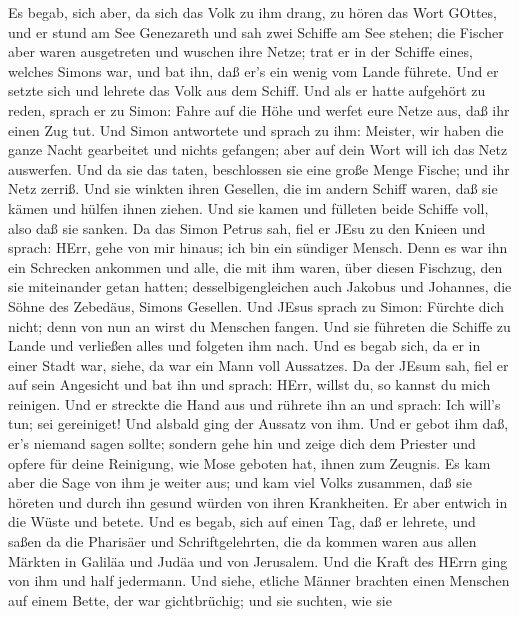 Es begab, sich aber, da sich das Volk zu ihm drang, zu
hören das Wort GOttes, und er stund am See Genezareth  und
sah zwei Schiffe am See stehen; die Fischer aber waren ausgetreten und
wuschen ihre Netze;  trat er in der Schiffe eines, welches
Simons war, und bat ihn, daß er's ein wenig vom Lande führete. Und er
setzte sich und lehrete das Volk aus dem Schiff.  Und als er
hatte aufgehört zu reden, sprach er zu Simon: Fahre auf die Höhe und
werfet eure Netze aus, daß ihr einen Zug tut.  Und Simon
antwortete und sprach zu ihm: Meister, wir haben die ganze Nacht
gearbeitet und nichts gefangen; aber auf dein Wort will ich das Netz
auswerfen.  Und da sie das taten, beschlossen sie eine große
Menge Fische; und ihr Netz zerriß.  Und sie winkten ihren
Gesellen, die im andern Schiff waren, daß sie kämen und hülfen ihnen
ziehen. Und sie kamen und fülleten beide Schiffe voll, also daß sie
sanken.  Da das Simon Petrus sah, fiel er JEsu zu den Knieen
und sprach: HErr, gehe von mir hinaus; ich bin ein sündiger Mensch.
 Denn es war ihn ein Schrecken ankommen und alle, die mit
ihm waren, über diesen Fischzug, den sie miteinander getan hatten;
 desselbigengleichen auch Jakobus und Johannes, die Söhne
des Zebedäus, Simons Gesellen. Und JEsus sprach zu Simon: Fürchte dich
nicht; denn von nun an wirst du Menschen fangen.  Und sie
führeten die Schiffe zu Lande und verließen alles und folgeten ihm nach.
 Und es begab sich, da er in einer Stadt war, siehe, da war
ein Mann voll Aussatzes. Da der JEsum sah, fiel er auf sein Angesicht
und bat ihn und sprach: HErr, willst du, so kannst du mich reinigen.
 Und er streckte die Hand aus und rührete ihn an und
sprach: Ich will's tun; sei gereiniget! Und alsbald ging der Aussatz von
ihm.  Und er gebot ihm daß, er's niemand sagen sollte;
sondern gehe hin und zeige dich dem Priester und opfere für deine
Reinigung, wie Mose geboten hat, ihnen zum Zeugnis.  Es kam
aber die Sage von ihm je weiter aus; und kam viel Volks zusammen, daß
sie höreten und durch ihn gesund würden von ihren Krankheiten.
 Er aber entwich in die Wüste und betete.  Und
es begab, sich auf einen Tag, daß er lehrete, und saßen da die Pharisäer
und Schriftgelehrten, die da kommen waren aus allen Märkten in Galiläa
und Judäa und von Jerusalem. Und die Kraft des HErrn ging von ihm und
half jedermann.  Und siehe, etliche Männer brachten einen
Menschen auf einem Bette, der war gichtbrüchig; und sie suchten, wie sie
